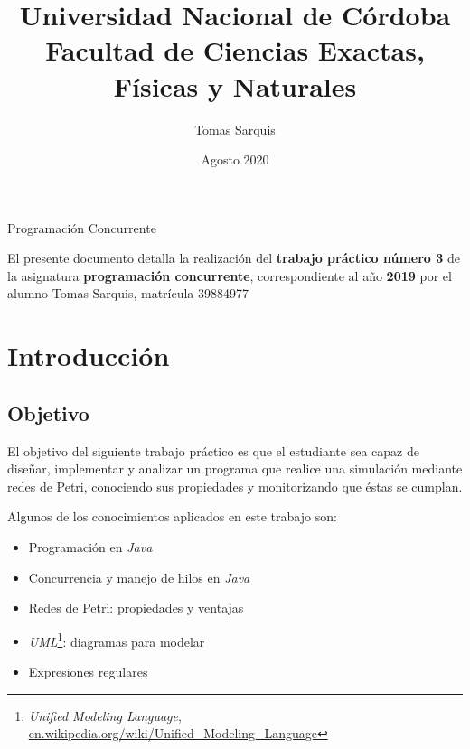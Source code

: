\documentclass{article}
\title{Universidad Nacional de Córdoba\\Facultad de Ciencias Exactas, Físicas y Naturales}
\author{Tomas Sarquis}
\date{Agosto 2020}
\newcommand{\fnuml}{\emph{Unified Modeling Language}, \url{en.wikipedia.org/wiki/Unified_Modeling_Language}}
\begin{document}
    \begin{titlingpage}
        \maketitle
        \null \null \null \null
        \begin{center}
            {\huge Programación Concurrente}
        \end{center}
        \vspace*{\fill}
        \justify
        El presente documento detalla la realización del \textbf{trabajo práctico número 3} 
        de la asignatura \textbf{programación concurrente}, correspondiente al año \textbf{2019}
        por el alumno Tomas Sarquis, matrícula 39884977
        \vspace*{\fill}
    \end{titlingpage}
    \tableofcontents 
    \newpage
    \section{Introducción}
    \subsection{Objetivo}
    El objetivo del siguiente trabajo práctico es que el estudiante sea capaz de diseñar,
    implementar y analizar un programa que realice una simulación mediante redes de Petri,
    conociendo sus propiedades y monitorizando que éstas se cumplan. \par
    Algunos de los conocimientos aplicados en este trabajo son:
    \begin{itemize}
        \item Programación en \emph{Java}
        \item Concurrencia y manejo de hilos en \emph{Java}
        \item Redes de Petri: propiedades y ventajas
        \item \emph{UML}\footnote{\fnuml}: diagramas para modelar
        \item Expresiones regulares
    \end{itemize}
\end{document}
